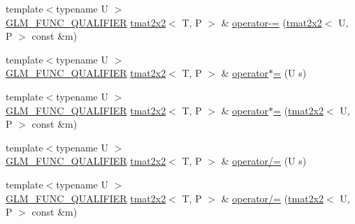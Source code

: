 \begin{DoxyCompactItemize}
\item 
{\footnotesize template$<$typename U $>$ }\\\hyperlink{setup_8hpp_a33fdea6f91c5f834105f7415e2a64407}{G\+L\+M\+\_\+\+F\+U\+N\+C\+\_\+\+Q\+U\+A\+L\+I\+F\+I\+ER} \hyperlink{structglm_1_1detail_1_1tmat2x2}{tmat2x2}$<$ T, P $>$ \& \hyperlink{structglm_1_1detail_1_1tmat2x2_acde6e0cc0e3c1df956a9e5fd0f3bbacd}{operator-\/=} (\hyperlink{structglm_1_1detail_1_1tmat2x2}{tmat2x2}$<$ U, P $>$ const \&m)
\item 
{\footnotesize template$<$typename U $>$ }\\\hyperlink{setup_8hpp_a33fdea6f91c5f834105f7415e2a64407}{G\+L\+M\+\_\+\+F\+U\+N\+C\+\_\+\+Q\+U\+A\+L\+I\+F\+I\+ER} \hyperlink{structglm_1_1detail_1_1tmat2x2}{tmat2x2}$<$ T, P $>$ \& \hyperlink{structglm_1_1detail_1_1tmat2x2_a4a5205fca7f31a7a453210d511cf2896}{operator$\ast$=} (U s)
\item 
{\footnotesize template$<$typename U $>$ }\\\hyperlink{setup_8hpp_a33fdea6f91c5f834105f7415e2a64407}{G\+L\+M\+\_\+\+F\+U\+N\+C\+\_\+\+Q\+U\+A\+L\+I\+F\+I\+ER} \hyperlink{structglm_1_1detail_1_1tmat2x2}{tmat2x2}$<$ T, P $>$ \& \hyperlink{structglm_1_1detail_1_1tmat2x2_a8487379d072e00b6de5a77b7e655867b}{operator$\ast$=} (\hyperlink{structglm_1_1detail_1_1tmat2x2}{tmat2x2}$<$ U, P $>$ const \&m)
\item 
{\footnotesize template$<$typename U $>$ }\\\hyperlink{setup_8hpp_a33fdea6f91c5f834105f7415e2a64407}{G\+L\+M\+\_\+\+F\+U\+N\+C\+\_\+\+Q\+U\+A\+L\+I\+F\+I\+ER} \hyperlink{structglm_1_1detail_1_1tmat2x2}{tmat2x2}$<$ T, P $>$ \& \hyperlink{structglm_1_1detail_1_1tmat2x2_a76aee63b12a716f287b47869fe0278e4}{operator/=} (U s)
\item 
{\footnotesize template$<$typename U $>$ }\\\hyperlink{setup_8hpp_a33fdea6f91c5f834105f7415e2a64407}{G\+L\+M\+\_\+\+F\+U\+N\+C\+\_\+\+Q\+U\+A\+L\+I\+F\+I\+ER} \hyperlink{structglm_1_1detail_1_1tmat2x2}{tmat2x2}$<$ T, P $>$ \& \hyperlink{structglm_1_1detail_1_1tmat2x2_a59558381fd4daac499407f3d83e71da0}{operator/=} (\hyperlink{structglm_1_1detail_1_1tmat2x2}{tmat2x2}$<$ U, P $>$ const \&m)
\end{DoxyCompactItemize}
